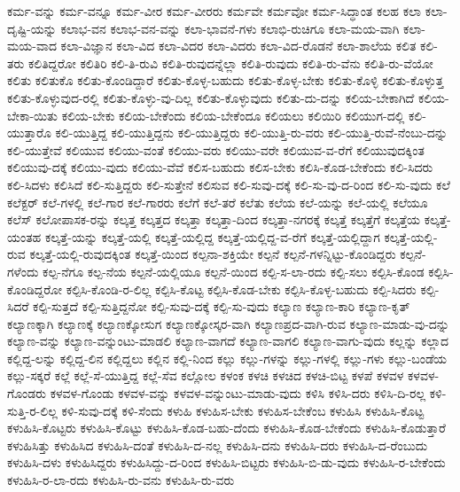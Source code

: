 {ಕರ್ಮ-ವನ್ನು
ಕರ್ಮ-ವನ್ನೂ
ಕರ್ಮ-ವೀರ
ಕರ್ಮ-ವೀರರು
ಕರ್ಮವೇ
ಕರ್ಮವೋ
ಕರ್ಮ-ಸಿದ್ಧಾಂತ
ಕಲಹ
ಕಲಾ
ಕಲಾ-ದೃಷ್ಟಿ-ಯನ್ನು
ಕಲಾಭ-ವನ
ಕಲಾಭ-ವನ-ವನ್ನು
ಕಲಾ-ಭಾವನೆ-ಗಳು
ಕಲಾಭಿ-ರುಚಿಗೂ
ಕಲಾ-ಮಯ-ವಾಗಿ
ಕಲಾ-ಮಯ-ವಾದ
ಕಲಾ-ವಿಜ್ಞಾನ
ಕಲಾ-ವಿದ
ಕಲಾ-ವಿದರ
ಕಲಾ-ವಿದರು
ಕಲಾ-ವಿದ-ರೊಡನೆ
ಕಲಾ-ಶಾಲೆಯ
ಕಲಿತ
ಕಲಿ-ತರು
ಕಲಿತಿದ್ದರೋ
ಕಲಿತಿರಿ
ಕಲಿ-ತಿ-ರುವಿ
ಕಲಿತಿ-ರುವುದನ್ನೆಲ್ಲಾ
ಕಲಿತಿ-ರುವುದು
ಕಲಿತಿ-ರು-ವೆನು
ಕಲಿತಿ-ರು-ವೆಯೋ
ಕಲಿತು
ಕಲಿತುಕೊ
ಕಲಿತು-ಕೊಂಡಿದ್ದಾರೆ
ಕಲಿತು-ಕೊಳ್ಳ-ಬಹುದು
ಕಲಿತು-ಕೊಳ್ಳ-ಬೇಕು
ಕಲಿತು-ಕೊಳ್ಳಿ
ಕಲಿತು-ಕೊಳ್ಳುತ್ತ
ಕಲಿತು-ಕೊಳ್ಳುವುದ-ರಲ್ಲಿ
ಕಲಿತು-ಕೊಳ್ಳು-ವು-ದಿಲ್ಲ
ಕಲಿತು-ಕೊಳ್ಳುವುದು
ಕಲಿತು-ದು-ದನ್ನು
ಕಲಿಯ-ಬೇಕಾಗಿದೆ
ಕಲಿಯ-ಬೇಕಾ-ಯಿತು
ಕಲಿಯ-ಬೇಕು
ಕಲಿಯ-ಬೇಕೆಂದು
ಕಲಿಯ-ಬೇಕೆಂದೂ
ಕಲಿಯಲು
ಕಲಿಯಿರಿ
ಕಲಿಯುಗ-ದಲ್ಲಿ
ಕಲಿ-ಯುತ್ತಾರೊ
ಕಲಿ-ಯುತ್ತಿದ್ದ
ಕಲಿ-ಯುತ್ತಿದ್ದನು
ಕಲಿ-ಯುತ್ತಿದ್ದರು
ಕಲಿ-ಯುತ್ತಿ-ರು-ವರು
ಕಲಿ-ಯುತ್ತಿ-ರುವೆ-ನೆಂಬು-ದನ್ನು
ಕಲಿ-ಯುತ್ತೇವೆ
ಕಲಿಯುವ
ಕಲಿಯು-ವಂತೆ
ಕಲಿಯು-ವರು
ಕಲಿಯು-ವರೇ
ಕಲಿಯುವ-ವ-ರೆಗೆ
ಕಲಿಯುವುದಕ್ಕಿಂತ
ಕಲಿಯುವು-ದಕ್ಕೆ
ಕಲಿಯು-ವುದು
ಕಲಿಯು-ವೆವೆ
ಕಲಿಸ-ಬಹುದು
ಕಲಿಸ-ಬೇಕು
ಕಲಿಸಿ-ಕೊಡ-ಬೇಕೆಂದು
ಕಲಿ-ಸಿದರು
ಕಲಿ-ಸಿದಳು
ಕಲಿಸಿದೆ
ಕಲಿ-ಸುತ್ತಿದ್ದರು
ಕಲಿ-ಸುತ್ತೇನೆ
ಕಲಿಸುವ
ಕಲಿ-ಸುವು-ದಕ್ಕೆ
ಕಲಿ-ಸು-ವು-ದ-ರಿಂದ
ಕಲಿ-ಸು-ವುದು
ಕಲೆ
ಕಲೆಕ್ಟರ್
ಕಲೆ-ಗಳಲ್ಲಿ
ಕಲೆ-ಗಾರ
ಕಲೆ-ಗಾರರು
ಕಲೆಗೆ
ಕಲೆ-ತರೆ
ಕಲೆತು
ಕಲೆಯ
ಕಲೆ-ಯನ್ನು
ಕಲೆ-ಯಲ್ಲಿ
ಕಲೆಯೂ
ಕಲೆಸ್
ಕಲೋಪಾಸಕ-ರನ್ನು
ಕಲ್ಕತ್ತ
ಕಲ್ಕತ್ತದ
ಕಲ್ಕತ್ತಾ
ಕಲ್ಕತ್ತಾ-ದಿಂದ
ಕಲ್ಕತ್ತಾ-ನಗರಕ್ಕೆ
ಕಲ್ಕತ್ತೆ
ಕಲ್ಕತ್ತೆಗೆ
ಕಲ್ಕತ್ತೆಯ
ಕಲ್ಕತ್ತೆ-ಯಂತಹ
ಕಲ್ಕತ್ತೆ-ಯನ್ನು
ಕಲ್ಕತ್ತೆ-ಯಲ್ಲಿ
ಕಲ್ಕತ್ತೆ-ಯಲ್ಲಿದ್ದ
ಕಲ್ಕತ್ತೆ-ಯಲ್ಲಿದ್ದ-ವ-ರೆಗೆ
ಕಲ್ಕತ್ತೆ-ಯಲ್ಲಿದ್ದಾಗ
ಕಲ್ಕತ್ತೆ-ಯಲ್ಲಿ-ರುವ
ಕಲ್ಕತ್ತೆ-ಯಲ್ಲಿ-ರುವುದಕ್ಕಿಂತ
ಕಲ್ಕತ್ತೆ-ಯಿಂದ
ಕಲ್ಪನಾ-ಶಕ್ತಿಯೇ
ಕಲ್ಪನೆ
ಕಲ್ಪನೆ-ಗಳನ್ನಿಟ್ಟು-ಕೊಂಡಿದ್ದರು
ಕಲ್ಪನೆ-ಗಳೆಂದು
ಕಲ್ಪ-ನೆಗೂ
ಕಲ್ಪ-ನೆಯ
ಕಲ್ಪನೆ-ಯಲ್ಲಿಯೂ
ಕಲ್ಪನೆ-ಯಿಂದ
ಕಲ್ಪಿ-ಸ-ಲಾ-ರದು
ಕಲ್ಪಿ-ಸಲು
ಕಲ್ಪಿಸಿ-ಕೊಂಡ
ಕಲ್ಪಿಸಿ-ಕೊಂಡಿದ್ದರೋ
ಕಲ್ಪಿಸಿ-ಕೊಂಡಿ-ರ-ಲಿಲ್ಲ
ಕಲ್ಪಿಸಿ-ಕೊಟ್ಟ
ಕಲ್ಪಿಸಿ-ಕೊಡ-ಬೇಕು
ಕಲ್ಪಿಸಿ-ಕೊಳ್ಳ-ಬಹುದು
ಕಲ್ಪಿ-ಸಿದರು
ಕಲ್ಪಿ-ಸಿದರೆ
ಕಲ್ಪಿ-ಸುತ್ತದೆ
ಕಲ್ಪಿ-ಸುತ್ತಿದ್ದನೋ
ಕಲ್ಪಿ-ಸುವು-ದಕ್ಕೆ
ಕಲ್ಪಿ-ಸು-ವುದು
ಕಲ್ಯಾಣ
ಕಲ್ಯಾಣ-ಕಾರಿ
ಕಲ್ಯಾಣ-ಕೃತ್
ಕಲ್ಯಾಣಕ್ಕಾಗಿ
ಕಲ್ಯಾಣಕ್ಕೆ
ಕಲ್ಯಾಣಕ್ಕೋಸುಗ
ಕಲ್ಯಾಣಕ್ಕೋಸ್ಕರ-ವಾಗಿ
ಕಲ್ಯಾಣಪ್ರದ-ವಾಗಿ-ರುವ
ಕಲ್ಯಾಣ-ಮಾಡು-ವು-ದನ್ನು
ಕಲ್ಯಾಣ-ವನ್ನು
ಕಲ್ಯಾಣ-ವನ್ನುಂಟು-ಮಾಡಲಿ
ಕಲ್ಯಾಣ-ವಾಗದೆ
ಕಲ್ಯಾಣ-ವಾಗಲಿ
ಕಲ್ಯಾಣ-ವಾಗು-ವುದು
ಕಲ್ಲನ್ನು
ಕಲ್ಲಾದ
ಕಲ್ಲಿದ್ದ-ಲನ್ನು
ಕಲ್ಲಿದ್ದ-ಲಿನ
ಕಲ್ಲಿದ್ದಲು
ಕಲ್ಲಿನ
ಕಲ್ಲಿ-ನಿಂದ
ಕಲ್ಲು
ಕಲ್ಲು-ಗಳನ್ನು
ಕಲ್ಲು-ಗಳಲ್ಲಿ
ಕಲ್ಲು-ಗಳು
ಕಲ್ಲು-ಬಂಡೆಯ
ಕಲ್ಲು-ಸಕ್ಕರೆ
ಕಲ್ಲೆ
ಕಲ್ಲೆ-ಸೆ-ಯುತ್ತಿದ್ದ
ಕಲ್ಲೆ-ಸೆವ
ಕಲ್ಲೋಲ
ಕಳಂಕ
ಕಳಚಿ
ಕಳಚಿದ
ಕಳಚಿ-ಬಿಟ್ಟ
ಕಳಪೆ
ಕಳವಳ
ಕಳವಳ-ಗೊಂಡರು
ಕಳವಳ-ಗೊಂಡು
ಕಳವಳ-ವನ್ನು
ಕಳವಳ-ವನ್ನುಂಟು-ಮಾಡು-ವುದು
ಕಳಿಸಿ
ಕಳಿಸಿ-ದರು
ಕಳಿಸಿ-ದಿ-ರಲ್ಲ
ಕಳಿ-ಸುತ್ತಿ-ರ-ಲಿಲ್ಲ
ಕಳಿ-ಸುವು-ದಕ್ಕೆ
ಕಳಿ-ಸೆಂದು
ಕಳುಹಿ
ಕಳುಹಿಸ-ಬೇಕು
ಕಳುಹಿಸ-ಬೇಕೆಂಬ
ಕಳುಹಿಸಿ
ಕಳುಹಿಸಿ-ಕೊಟ್ಟ
ಕಳುಹಿಸಿ-ಕೊಟ್ಟರು
ಕಳುಹಿಸಿ-ಕೊಟ್ಟು
ಕಳುಹಿಸಿ-ಕೊಡ-ಬಹು-ದೆಂದು
ಕಳುಹಿಸಿ-ಕೊಡ-ಬೇಕೆಂದು
ಕಳುಹಿಸಿ-ಕೊಡುತ್ತಾರೆ
ಕಳುಹಿಸಿತ್ತು
ಕಳುಹಿಸಿದ
ಕಳುಹಿಸಿ-ದಂತೆ
ಕಳುಹಿಸಿ-ದ-ನಲ್ಲ
ಕಳುಹಿಸಿ-ದನು
ಕಳುಹಿಸಿ-ದರು
ಕಳುಹಿಸಿ-ದ-ರೆಂಬುದು
ಕಳುಹಿಸಿ-ದಳು
ಕಳುಹಿಸಿದ್ದರು
ಕಳುಹಿಸಿದ್ದು-ದ-ರಿಂದ
ಕಳುಹಿಸಿ-ಬಿಟ್ಟರು
ಕಳುಹಿಸಿ-ಬಿ-ಡು-ವುದು
ಕಳುಹಿಸಿ-ರ-ಬೇಕೆಂದು
ಕಳುಹಿಸಿ-ರ-ಲಾ-ರದು
ಕಳುಹಿಸಿ-ರು-ವನು
ಕಳುಹಿಸಿ-ರು-ವರು
}
